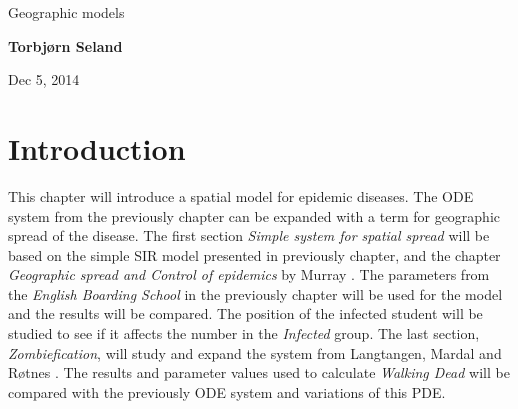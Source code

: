 \documentclass[%
twoside,                 %
final,                   %
10pt]{article}
\begin{document}






\thispagestyle{empty}

\begin{center}
{\LARGE\bf
\begin{spacing}{1.25}
Geographic models 
\end{spacing}
}
\end{center}


\begin{center}
{\bf Torbjørn Seland${}^{}$} \\ [0mm]
\end{center}

    \begin{center}
\end{center}


\begin{center}
Dec 5, 2014
\end{center}

\vspace{1cm}


\tableofcontents


\vspace{1cm} %




\section{Introduction}
This chapter will introduce a spatial model for epidemic diseases. The ODE system from the previously chapter can be expanded with a term for geographic spread of the disease. The first section \emph{Simple system for spatial spread} will be based on the simple SIR model presented in previously chapter, and the chapter \emph{Geographic spread and Control of epidemics} by Murray \cite{murray2003mathematical}. The parameters from the \emph{English Boarding School} in the previously chapter will be used for the model and the results will be compared. The position of the infected student will be studied to see if it affects the number in the \emph{Infected} group. The last section, \emph{Zombiefication}, will study and expand the system from Langtangen, Mardal and Røtnes \cite{zombie-math}. The results and parameter values used to calculate \emph{Walking Dead} will be compared with the previously ODE system and variations of this PDE. 
\end{document}
